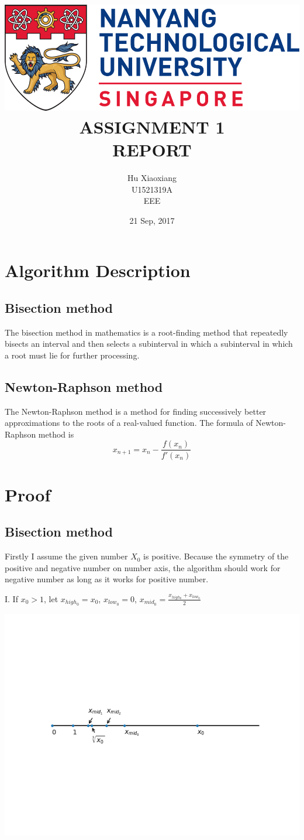 \documentclass[titlepage]{article}
\author{Hu Xiaoxiang \\
U1521319A \\
EEE \\
}
\date{21 Sep, 2017 \\
}
\title{\includegraphics[width=\textwidth]{logo_ntu_new.png} \\
[5\baselineskip] ASSIGNMENT 1 \\
REPORT \\
[5\baselineskip]}
\begin{document}
\maketitle
\tableofcontents

\newpage
{}

\section{Algorithm Description}
\label{sec:orga3c9568}
\subsection{Bisection method}
\label{sec:org749411f}
The bisection method in mathematics is a root-finding method that repeatedly
bisects an interval and then selects a subinterval in which a subinterval
in which a root must lie for further processing.
\subsection{Newton-Raphson method}
\label{sec:orgcf5e916}
The Newton-Raphson method is a method for finding successively better
approximations to the roots of a real-valued function. The formula of
Newton-Raphson method is $$x_{n+1} = x_n - \frac{f(x_n)}{f'(x_n)}$$

\section{Proof}
\label{sec:org02a4782}
\subsection{Bisection method}
\label{sec:orgb427149}
Firstly I assume the given number \(X_0\) is positive. Because the symmetry of
the positive and negative number on number axis, the algorithm should work
for negative number as long as it works for positive number.

I. If \(x_0 > 1\), let \(x_{high_0} = x_0\), \(x_{low_0} = 0\), \(x_{mid_0} = \frac{x_{high_0} + x_{low_0}}{2}\)
\begin{center}
\includegraphics[width=.9\linewidth]{numberAxis1.png}
\end{center}
\end{document}
